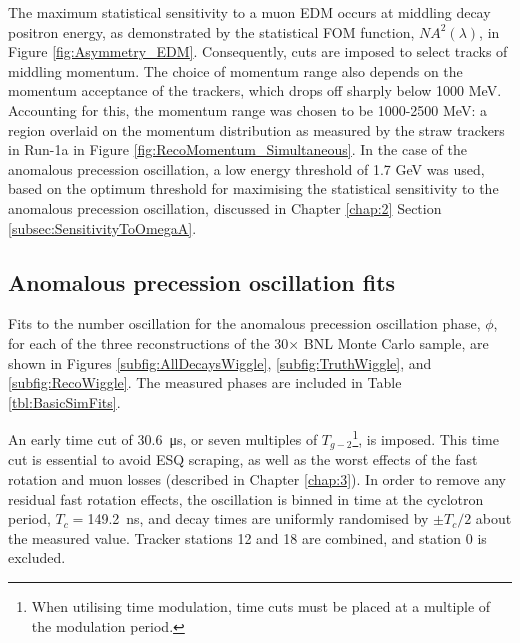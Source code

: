 The maximum statistical sensitivity to a muon EDM occurs at middling decay positron energy, as demonstrated by the statistical FOM function, $NA^{2}(\lambda)$, in Figure \ref{fig:Asymmetry_EDM}. Consequently, cuts are imposed to select tracks of middling momentum. The choice of momentum range also depends on the momentum acceptance of the trackers, which drops off sharply below 1000 MeV. Accounting for this, the momentum range was chosen to be 1000-2500 MeV: a region overlaid on the momentum distribution as measured by the straw trackers in Run-1a in Figure \ref{fig:RecoMomentum_Simultaneous}. In the case of the anomalous precession oscillation, a low energy threshold of 1.7 GeV was used, based on the optimum threshold for maximising the statistical sensitivity to the anomalous precession oscillation, discussed in Chapter \ref{chap:2} Section \ref{subsec:SensitivityToOmegaA}.

\subsection{Anomalous precession oscillation fits}

Fits to the number oscillation for the anomalous precession oscillation phase, $\phi$, for each of the three reconstructions of the 30$\times$ BNL Monte Carlo sample, are shown in Figures \ref{subfig:AllDecaysWiggle}, \ref{subfig:TruthWiggle}, and \ref{subfig:RecoWiggle}. The measured phases are included in Table \ref{tbl:BasicSimFits}.

An early time cut of \SI{30.6}{\micro\second}, or seven multiples of $T_{g-2}$\footnote{When utilising time modulation, time cuts must be placed at a multiple of the modulation period.}, is imposed. This time cut is essential to avoid ESQ scraping, as well as the worst effects of the fast rotation and muon losses (described in Chapter \ref{chap:3}). In order to remove any residual fast rotation effects, the oscillation is binned in time at the cyclotron period, $T_{c} = $\SI{149.2}{\nano\second}, and decay times are uniformly randomised by $\pm T_{c}/2$ about the measured value. Tracker stations 12 and 18 are combined, and station 0 is excluded. 

